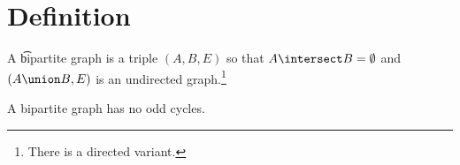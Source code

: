 
\section*{Definition}

A \t{bipartite graph} is a triple $(A, B, E)$ so that $A \intersect B = \emptyset$ and $(A \union B, E)$ is an undirected graph.\footnote{There is a directed variant.}

\begin{proposition}
A bipartite graph has no odd cycles.
\end{proposition}

\blankpage